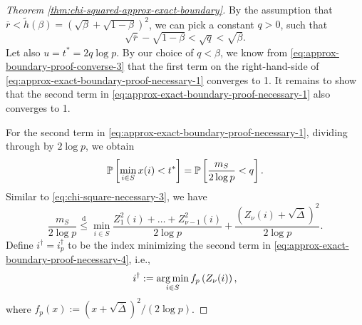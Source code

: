 \begin{proof}[Theorem \ref{thm:chi-squared-approx-exact-boundary}]
By the assumption that $\overline{r}<\widetilde{h}(\beta)=(\sqrt{\beta}+\sqrt{1-\beta})^2$, we can pick a constant $q>0$, such that 
\begin{equation} \label{eq:approx-exact-boundary-proof-necessary-2}
    \sqrt{\overline{r}} - \sqrt{1-\beta} < \sqrt{q} < \sqrt{\beta}.
\end{equation}
Let also $u = t^*=2q\log{p}$.
By our choice of $q < \beta$, we know from \eqref{eq:approx-boundary-proof-converse-3} that the first term on the right-hand-side of \eqref{eq:approx-exact-boundary-proof-necessary-1} converges to 1.
It remains to show that the second term in \eqref{eq:approx-exact-boundary-proof-necessary-1} also converges to 1.

For the second term in \eqref{eq:approx-exact-boundary-proof-necessary-1}, dividing through by $2\log{p}$, we obtain
\begin{equation} \label{eq:approx-exact-boundary-proof-necessary-3}
    \P\left[\min_{i\in S}x(i)<t^*\right] = \P\left[ \frac{m_{S}}{2\log{p}} < q \right].
\end{equation}
Similar to \eqref{eq:chi-square-necessary-3}, we have
\begin{equation} \label{eq:approx-exact-boundary-proof-necessary-4}
    \frac{m_{S}}{2\log{p}} 
    \stackrel{\mathrm{d}}{\le} \min_{i\in S}\frac{Z_1^2(i) + \ldots + Z_{\nu-1}^2(i)}{2\log{p}} + \frac{(Z_\nu(i) + \sqrt{\overline{\Delta}})^2}{2\log{p}}.
\end{equation}
Define $i^\dagger = i^\dagger_p$ to be the index minimizing the second term in \eqref{eq:approx-exact-boundary-proof-necessary-4}, i.e.,
\begin{equation}
    i^\dagger := \argmin_{i\in S} f_p\left(Z_\nu(i)\right),
\end{equation}
where $f_p(x):=(x+\sqrt{\overline{\Delta}})^2/(2\log{p})$. 


\end{proof}
